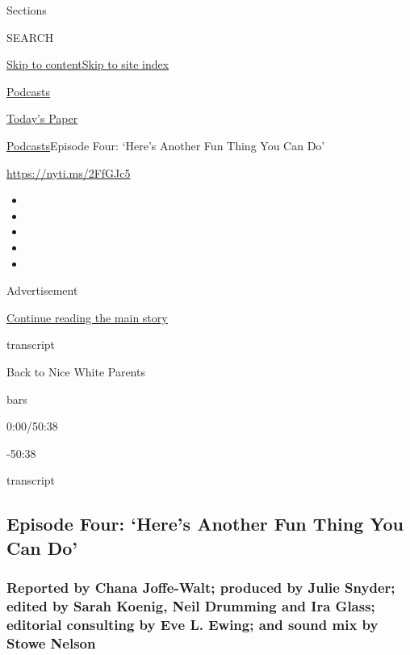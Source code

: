 Sections

SEARCH

\protect\hyperlink{site-content}{Skip to
content}\protect\hyperlink{site-index}{Skip to site index}

\href{https://www.nytimes3xbfgragh.onion/spotlight/podcasts}{Podcasts}

\href{https://myaccount.nytimes3xbfgragh.onion/auth/login?response_type=cookie\&client_id=vi}{}

\href{https://www.nytimes3xbfgragh.onion/section/todayspaper}{Today's
Paper}

\href{/spotlight/podcasts}{Podcasts}\textbar{}Episode Four: `Here's
Another Fun Thing You Can Do'

\url{https://nyti.ms/2FfGJc5}

\begin{itemize}
\item
\item
\item
\item
\item
\end{itemize}

Advertisement

\protect\hyperlink{after-top}{Continue reading the main story}

transcript

Back to Nice White Parents

bars

0:00/50:38

-50:38

transcript

\hypertarget{episode-four-heres-another-fun-thing-you-can-do}{%
\subsection{Episode Four: `Here's Another Fun Thing You Can
Do'}\label{episode-four-heres-another-fun-thing-you-can-do}}

\hypertarget{reported-by-chana-joffe-walt-produced-by-julie-snyder-edited-by-sarah-koenig-neil-drumming-and-ira-glass-editorial-consulting-by-eve-l-ewing-and-sound-mix-by-stowe-nelson}{%
\subsubsection{Reported by Chana Joffe-Walt; produced by Julie Snyder;
edited by Sarah Koenig, Neil Drumming and Ira Glass; editorial
consulting by Eve L. Ewing; and sound mix by Stowe
Nelson}\label{reported-by-chana-joffe-walt-produced-by-julie-snyder-edited-by-sarah-koenig-neil-drumming-and-ira-glass-editorial-consulting-by-eve-l-ewing-and-sound-mix-by-stowe-nelson}}

